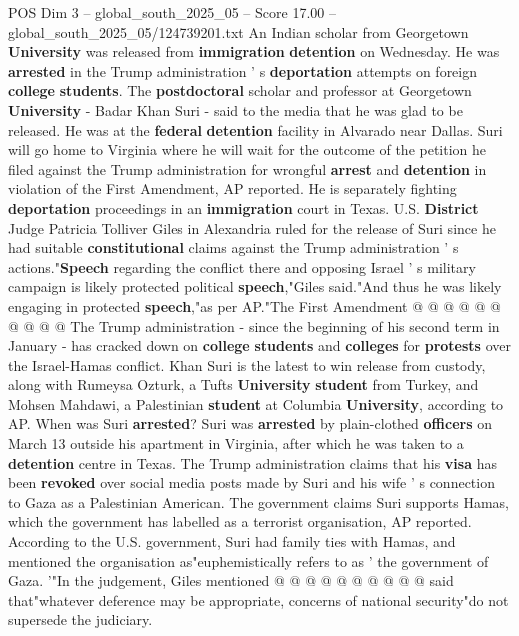 \begin{textsample}{POS Dim 3 – global\_south\_2025\_05 – Score 17.00 – global\_south\_2025\_05/124739201.txt}  \label{ex:f3_pos_287}
An Indian scholar from Georgetown \textbf{University} was released from \textbf{immigration} \textbf{detention} on Wednesday.
He was \textbf{arrested} in the Trump administration ' s \textbf{deportation} attempts on foreign \textbf{college} \textbf{students}.
The \textbf{postdoctoral} scholar and professor at Georgetown \textbf{University} - Badar Khan Suri - said to the media that he was glad to be released.
He was at the \textbf{federal} \textbf{detention} facility in Alvarado near Dallas.
Suri will go home to Virginia where he will wait for the outcome of the petition he filed against the Trump administration for wrongful \textbf{arrest} and \textbf{detention} in violation of the First Amendment, AP reported.
He is separately fighting \textbf{deportation} proceedings in an \textbf{immigration} court in Texas.
U.S. \textbf{District} Judge Patricia Tolliver Giles in Alexandria ruled for the release of Suri since he had suitable \textbf{constitutional} claims against the Trump administration ' s actions."\textbf{Speech} regarding the conflict there and opposing Israel ' s military campaign is likely protected political \textbf{speech},"Giles said."And thus he was likely engaging in protected \textbf{speech},"as per AP."The First Amendment @ @ @ @ @ @ @ @ @ @ The Trump administration - since the beginning of his second term in January - has cracked down on \textbf{college} \textbf{students} and \textbf{colleges} for \textbf{protests} over the Israel-Hamas conflict.
Khan Suri is the latest to win release from custody, along with Rumeysa Ozturk, a Tufts \textbf{University} \textbf{student} from Turkey, and Mohsen Mahdawi, a Palestinian \textbf{student} at Columbia \textbf{University}, according to AP.
When was Suri \textbf{arrested}?
Suri was \textbf{arrested} by plain-clothed \textbf{officers} on March 13 outside his apartment in Virginia, after which he was taken to a \textbf{detention} centre in Texas.
The Trump administration claims that his \textbf{visa} has been \textbf{revoked} over social media posts made by Suri and his wife ' s connection to Gaza as a Palestinian American.
The government claims Suri supports Hamas, which the government has labelled as a terrorist organisation, AP reported.
According to the U.S. government, Suri had family ties with Hamas, and mentioned the organisation as"euphemistically refers to as ' the government of Gaza. '"In the judgement, Giles mentioned @ @ @ @ @ @ @ @ @ @ said that"whatever deference may be appropriate, concerns of national security"do not supersede the judiciary.

\end{textsample}
